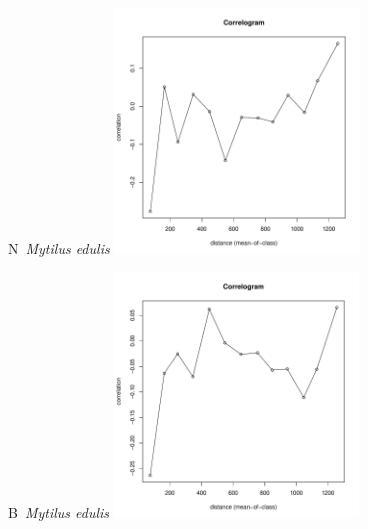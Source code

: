 \documentclass[12pt, a4paper]{disser}
\begin{document}
	\begin{figure}[h]

	\begin{minipage}[b]{.46\linewidth}
	\begin{center}
	{\small N~{\it Mytilus edulis}}
		\includegraphics[width=65mm]{../Barenc_Sea/distribution_Moran/Plyazh081_moran_N_Mytilus_edulis_.pdf}
	\end{center}
	\end{minipage}
%
	\hfil %
%
	\begin{minipage}[b]{.46\linewidth}
	\begin{center}
	{\small B~{\it Mytilus edulis}}
		\includegraphics[width=65mm]{../Barenc_Sea/distribution_Moran/Plyazh081_moran_B_Mytilus_edulis_.pdf}
	\end{center}
	\end{minipage}


\end{figure}
\end{document}
